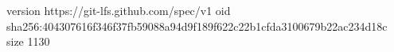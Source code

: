 version https://git-lfs.github.com/spec/v1
oid sha256:404307616f346f37fb59088a94d9f189f622c22b1cfda3100679b22ac234d18c
size 1130
